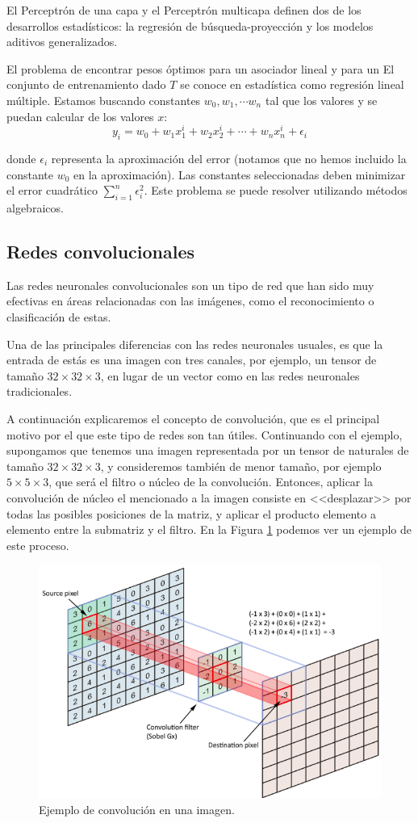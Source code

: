 \documentclass[
  a4paper,
  12pt,
  spanish,
]{scrartcl}
\theoremstyle{teorema-style}
\begin{document}
El Perceptrón de una capa y el Perceptrón multicapa definen dos de los desarrollos estadísticos: la regresión de búsqueda-proyección y los modelos aditivos generalizados.

El problema de encontrar pesos óptimos para un asociador lineal y para un
El conjunto de entrenamiento dado $T$ se conoce en estadística como regresión lineal múltiple. Estamos
buscando constantes $w_0, w_1, \cdots w_n$ tal que los valores y se puedan calcular
de los valores $x$:
$$y_i = w_0 + w_1 x_1^i + w_2 x_2^i + \cdots + w_n x_n^i + \epsilon_i $$

donde $\epsilon_i$ representa la aproximación del error (notamos que no hemos incluido la constante $w_0$ en la aproximación). Las constantes seleccionadas deben minimizar el error cuadrático $\sum_{i=1}^{n} \epsilon_i^2$. Este problema se puede resolver utilizando métodos algebraicos.

\subsection{Redes convolucionales}%
\label{sub:redes_convolucionales}

Las redes neuronales convolucionales son un tipo de red que han sido muy efectivas en áreas relacionadas con las imágenes, como el reconocimiento o clasificación de estas.

Una de las principales diferencias con las redes neuronales usuales, es que la entrada de estás es una imagen con tres canales, por ejemplo, un tensor de tamaño $32\times 32 \times 3$, en lugar de un vector como en las redes neuronales tradicionales.

A continuación explicaremos el concepto de convolución, que es el principal motivo por el que este tipo de redes son tan útiles. Continuando con el ejemplo, supongamos que tenemos una imagen representada por un tensor de naturales de tamaño $32\times 32 \times 3$, y consideremos también de menor tamaño, por ejemplo $5 \times 5 \times 3$, que será el filtro o núcleo de la convolución. Entonces, aplicar la convolución de núcleo el mencionado a la imagen consiste en <<desplazar>> por todas las posibles posiciones de la matriz, y aplicar el producto elemento a elemento entre la submatriz y el filtro. En la Figura \ref{fig:conv} podemos ver un ejemplo de este proceso.

\begin{figure}[h]
    \centering
    \includegraphics[width=0.7\linewidth]{img/conv.png}
    \caption{Ejemplo de convolución en una imagen.}%
    \label{fig:conv}
\end{figure}
\end{document}
